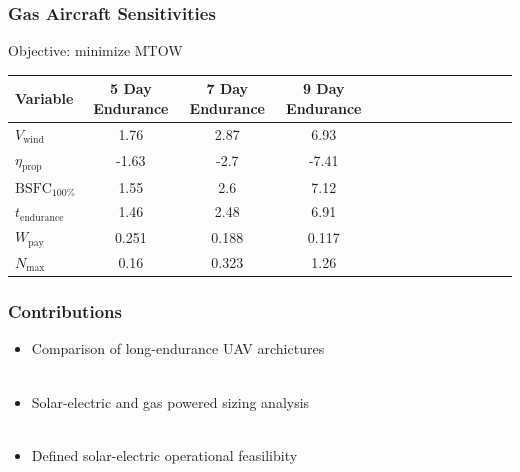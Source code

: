 \documentclass{beamer}
\begin{document}
\begin{frame}
    \frametitle{Gas Aircraft Sensitivities}
    
    Objective: minimize MTOW

    \scriptsize
    \begin{longtable}{lccccccccccccc}
        \toprule
        \toprule
        Variable & 5 Day Endurance & 7 Day Endurance & 9 Day Endurance\\
        \midrule
        $V_{\text{wind}}$ &1.76 & 2.87 & 6.93\\
        $\eta_{\text{prop}}$ &-1.63 & -2.7 & -7.41\\
        $\text{BSFC}_{100\%}$ &1.55 & 2.6 & 7.12\\
            $t_{\text{endurance}}$ &1.46 & 2.48 & 6.91\\
        $W_{\text{pay}}$ &0.251 & 0.188 & 0.117\\
        $N_{\text{max}}$ &0.16 & 0.323 & 1.26\\
        \bottomrule
        \end{longtable}
    
\end{frame}

\begin{frame}
    \frametitle{Contributions}

    \begin{itemize}
        \item Comparison of long-endurance UAV archictures \\~\\
        \item Solar-electric and gas powered sizing analysis \\~\\
        \item Defined solar-electric operational feasilibity \\~\\
        \end{itemize}

\end{frame}
\end{document}
